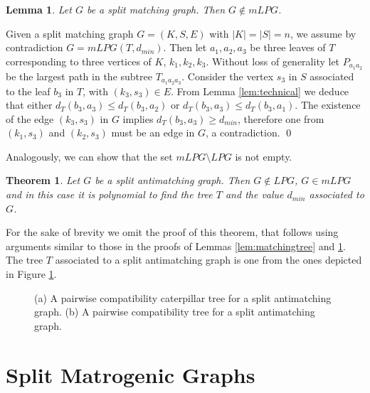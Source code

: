 \documentclass[dvipdfm]{llncs}
\newtheorem{Theorem}{Theorem}
\newtheorem{Lemma}{Lemma}
\newcommand{\dmin}{d_{min}}
\begin{document}
\begin{Lemma}\label{lem:matching2}
Let $G$ be a split matching graph. Then $G \not \in mLPG$.
\end{Lemma}
\proof
Given a split matching graph $G=(K,S,E)$ with $|K|=|S|=n$, we assume by contradiction $G=mLPG(T,\dmin)$. Then let $a_1,a_2,a_3$ be three leaves of $T$ corresponding to three vertices of $K$, $k_1,k_2,k_3$. Without loss of generality let $P_{a_1 a_2}$ be the largest path in the subtree $T_{a_1 a_2 a_3}$. Consider the vertex $s_3$ in $S$ associated to the leaf $b_3$ in $T$, with $(k_3, s_3) \in E$. From Lemma \ref{lem:technical} we deduce that either $d_T(b_3,a_3) \leq d_T(b_3,a_2)$ or $d_T(b_3,a_3) \leq d_T(b_3,a_1)$. The existence of the edge $(k_3,s_3)$ in $G$ implies $d_T(b_3,a_3) \geq \dmin$, therefore one from $(k_1, s_3)$ and $(k_2, s_3)$ must be an edge in $G$, a contradiction. \qed


Analogously, we can show that the set $mLPG \setminus LPG$ is not empty.

\begin{Theorem} \label{theo:splitantimatching}
Let $G$ be a split antimatching graph. Then $G \not \in LPG$,  $G \in mLPG$ and in this case it is polynomial to find the tree $T$ and the value $\dmin$ associated to $G$.
\end{Theorem}

For the sake of brevity we omit the proof of this theorem, that follows using arguments similar to those in the proofs of Lemmas \ref{lem:matchingtree} and \ref{lem:matching2}. The tree $T$ associated to a split antimatching graph is one from the ones depicted in Figure \ref{fig:anti}.

\begin{figure}[!ht]
  \begin{center}
  \end{center}
\caption{\footnotesize{(a) A pairwise compatibility caterpillar tree for a split antimatching graph. (b) A pairwise compatibility tree for a split antimatching graph.}}
\label{fig:anti}
\end{figure}


\section{Split Matrogenic Graphs}\label{sec:matrogenic}
\end{document}
